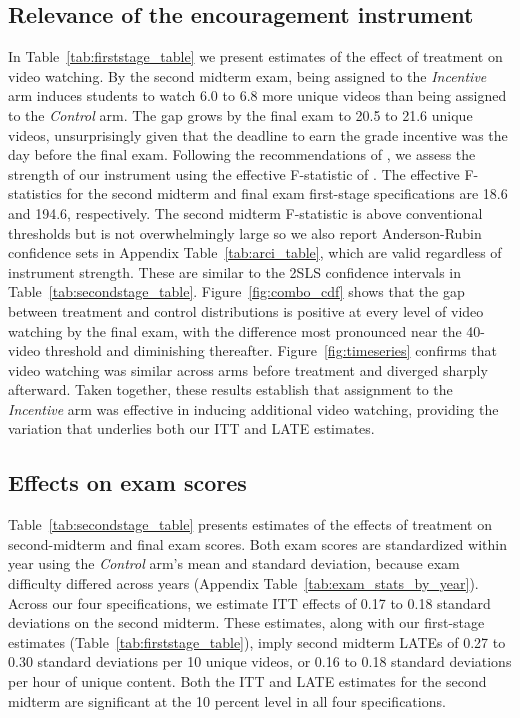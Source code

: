 \subsection{Relevance of the encouragement instrument}\label{subsec:relevancy}

In Table~\ref{tab:firststage_table} we present estimates of the effect of treatment on video watching.
By the second midterm exam, being assigned to the \textit{Incentive} arm induces students to watch 6.0 to 6.8 more unique videos than being assigned to the \textit{Control} arm.
The gap grows by the final exam to 20.5 to 21.6 unique videos, unsurprisingly given that the deadline to earn the grade incentive was the day before the final exam.
Following the recommendations of \textcite{ass2019}, we assess the strength of our instrument using the effective F-statistic of \textcite{op2013}.
The effective F-statistics for the second midterm and final exam first-stage specifications are 18.6 and 194.6, respectively.
The second midterm F-statistic is above conventional thresholds but is not overwhelmingly large so we also report Anderson-Rubin confidence sets in Appendix Table~\ref{tab:arci_table}, which are valid regardless of instrument strength.
These are similar to the 2SLS confidence intervals in Table~\ref{tab:secondstage_table}.
Figure~\ref{fig:combo_cdf} shows that the gap between treatment and control distributions is positive at every level of video watching by the final exam, with the difference most pronounced near the 40-video threshold and diminishing thereafter.
Figure~\ref{fig:timeseries} confirms that video watching was similar across arms before treatment and diverged sharply afterward.
Taken together, these results establish that assignment to the \textit{Incentive} arm was effective in inducing additional video watching, providing the variation that underlies both our ITT and LATE estimates.



\subsection{Effects on exam scores}\label{subsec:effects}

Table~\ref{tab:secondstage_table} presents estimates of the effects of treatment on second-midterm and final exam scores.
Both exam scores are standardized within year using the \textit{Control} arm's mean and standard deviation, because exam difficulty differed across years (Appendix Table~\ref{tab:exam_stats_by_year}).
Across our four specifications, we estimate ITT effects of 0.17 to 0.18 standard deviations on the second midterm.
These estimates, along with our first-stage estimates (Table~\ref{tab:firststage_table}), imply second midterm LATEs of 0.27 to 0.30 standard deviations per 10 unique videos, or 0.16 to 0.18 standard deviations per hour of unique content.
Both the ITT and LATE estimates for the second midterm are significant at the 10 percent level in all four specifications.


